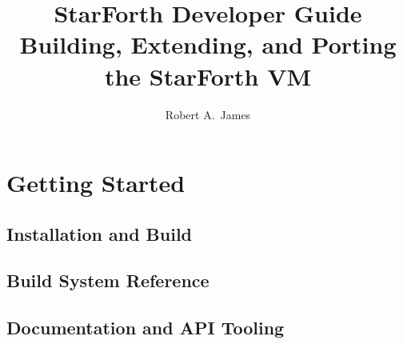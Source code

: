 


\title{StarForth Developer Guide\\[0.4em]
       \large Building, Extending, and Porting the StarForth VM}
\author{Robert A.\ James}
\date{%
}


\frontmatter
\maketitle
\tableofcontents

\mainmatter

\part{Getting Started}

\chapter{Installation and Build}





\chapter{Build System Reference}




\chapter{Documentation and API Tooling}





